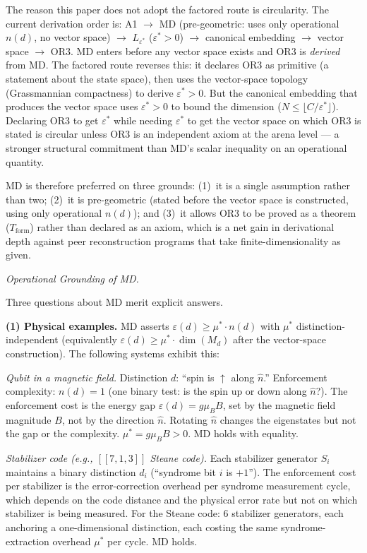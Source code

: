 \documentclass[11pt]{article}
\theoremstyle{remark}
\begin{document}
The reason this paper does not adopt the factored route is circularity.  The current derivation order is: A1 $\to$ MD (pre-geometric: uses only operational $n(d)$, no vector space) $\to$ $L_{\varepsilon^*}$ ($\varepsilon^* > 0$) $\to$ canonical embedding $\to$ vector space $\to$ OR3.  MD enters before any vector space exists and OR3 is \emph{derived} from MD.  The factored route reverses this: it declares OR3 as primitive (a statement about the state space), then uses the vector-space topology (Grassmannian compactness) to derive $\varepsilon^* > 0$.  But the canonical embedding that produces the vector space uses $\varepsilon^* > 0$ to bound the dimension ($N \le \lfloor C/\varepsilon^* \rfloor$).  Declaring OR3 to get $\varepsilon^*$ while needing $\varepsilon^*$ to get the vector space on which OR3 is stated is circular unless OR3 is an independent axiom at the arena level --- a stronger structural commitment than MD's scalar inequality on an operational quantity.

MD is therefore preferred on three grounds: (1)~it is a single assumption rather than two; (2)~it is pre-geometric (stated before the vector space is constructed, using only operational $n(d)$); and (3)~it allows OR3 to be proved as a theorem ($T_{\mathrm{form}}$) rather than declared as an axiom, which is a net gain in derivational depth against peer reconstruction programs that take finite-dimensionality as given.


\medskip\noindent\textit{Operational Grounding of MD.}
\label{box:MD_operational}

Three questions about MD merit explicit answers.

\medskip\noindent\textbf{(1) Physical examples.}  MD asserts $\varepsilon(d) \ge \mu^* \cdot n(d)$ with $\mu^*$ distinction-independent (equivalently $\varepsilon(d) \ge \mu^* \cdot \dim(M_d)$ after the vector-space construction).  The following systems exhibit this:

\textit{Qubit in a magnetic field.}  Distinction $d$: ``spin is $\uparrow$ along $\hat{n}$.''  Enforcement complexity: $n(d) = 1$ (one binary test: is the spin up or down along $\hat{n}$?).  The enforcement cost is the energy gap $\varepsilon(d) = g\mu_B B$, set by the magnetic field magnitude $B$, not by the direction $\hat{n}$.  Rotating $\hat{n}$ changes the eigenstates but not the gap or the complexity.  $\mu^* = g\mu_B B > 0$.  MD holds with equality.

\textit{Stabilizer code (e.g., $[\![7,1,3]\!]$ Steane code).}  Each stabilizer generator $S_i$ maintains a binary distinction $d_i$ (``syndrome bit $i$ is $+1$'').  The enforcement cost per stabilizer is the error-correction overhead per syndrome measurement cycle, which depends on the code distance and the physical error rate but not on which stabilizer is being measured.  For the Steane code: 6 stabilizer generators, each anchoring a one-dimensional distinction, each costing the same syndrome-extraction overhead $\mu^*$ per cycle.  MD holds.
\end{document}
